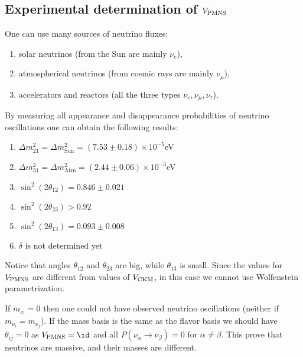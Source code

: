 \documentclass[TheoreticalPhy_ModB.tex]{subfiles}
\begin{document}
\subsection{Experimental determination of $V_{\text{PMNS}}$}

One can use many sources of neutrino fluxes:
\begin{enumerate}
	\item solar neutrinos (from the Sun are mainly $\nu_e$),
	\item atmospherical neutrinos (from cosmic rays are mainly $\nu_\mu$),
	\item accelerators and reactors (all the three types $\nu_e,\nu_\mu,\nu_\tau$).
\end{enumerate}

By measuring all appearance and disappearance probabilities of neutrino oscillations one can obtain the following results:
\begin{enumerate}
	\item $\Delta m_{21}^2 = \Delta m_{\text{Sun}}^2=(7.53\pm0.18)\times 10^{-5}$eV 
	\item $\Delta m_{31}^2=\Delta m_{\text{Atm}}^2=(2.44\pm0.06)\times 10^{-3}$eV
	\item $\sin^2(2\theta_{12})=0.846\pm0.021$
	\item $\sin^2(2\theta_{23})>0.92$
	\item $\sin^2(2\theta_{13})=0.093\pm0.008$
	\item $\delta$ is not determined yet
\end{enumerate}
Notice that angles $\theta_{12}$ and $\theta_{23}$ are big, while $\theta_{13}$ is small. Since the values for $V_{\text{PMNS}}$ are different from values of $V_{\text{CKM}}$, in this case we cannot use Wolfenstein parametrization. 

If $m_{\nu_i}=0$ then one could not have observed neutrino oscillations (neither if $m_{\nu_i}=m_{\nu_j}$). If the mass basis is the same as the flavor basis we should have $\theta_{ij}=0$ as $\pmns=\id$ and all $P(\nu_\alpha\rightarrow\nu_\beta)=0$ for $\alpha\neq\beta$. This prove that neutrinos are massive, and their masses are different. 
	
\end{document}
